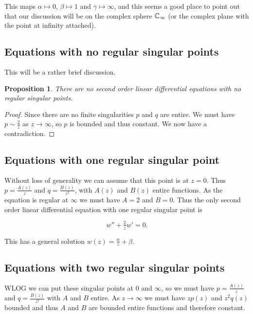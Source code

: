 \documentclass{notes}
\theoremstyle{plain}
\newtheorem*{proposition}{Proposition}
\begin{document}
This maps $\alpha \mapsto 0$, $\beta \mapsto 1$ and $\gamma \mapsto \infty$,
and this seems a good place to point out that our discussion will be
on the complex sphere $\mathbb{C}_\infty$ (or the complex plane with the point
at infinity attached).

\subsection{Equations with no regular singular points}

This will be a rather brief discussion.

\begin{proposition}
There are no second order linear differential equations with no regular
singular points.
\end{proposition}

\begin{proof}
Since there are no finite singularities $p$ and $q$ are entire.
We must have $p \sim \frac{2}{z}$ as $z \to \infty$, so $p$ is bounded
and thus constant.  We now have a contradiction.
\end{proof}

\subsection{Equations with one regular singular point}

Without loss of generality we can assume that this point is at $z=0$.  Thus
$p = \frac{A(z)}{z}$ and $q = \frac{B(z)}{z^2}$, with $A(z)$ and $B(z)$ entire
functions.  As the equation is regular at $\infty$ we must have $A = 2$
and $B=0$.  Thus the only second order linear differential equation with
one regular singular point is

\begin{equation}\label{eq:onesp}
w'' + \tfrac{2}{z} w' = 0.
\end{equation}

This has a general solution $w(z) = \frac{\alpha}{z} + \beta$.

\subsection{Equations with two regular singular points}

WLOG we can put these singular points at $0$ and $\infty$, so we must
have $p = \frac{A(z)}{z}$ and $q = \frac{B(z)}{z^2}$ with $A$ and $B$
entire.  As $z \to \infty$ we must have $z p(z)$ and $z^2 q(z)$ bounded
and thus $A$ and $B$ are bounded entire functions and therefore constant.
\end{document}
